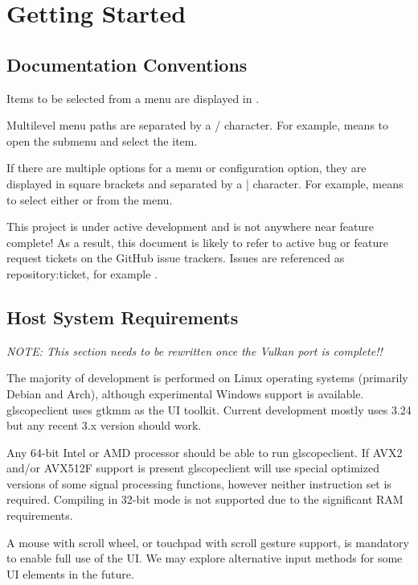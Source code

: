 \chapter{Getting Started}

\section{Documentation Conventions}

Items to be selected from a menu are displayed in .

Multilevel menu paths are separated by a / character. For example,  means to open the
 submenu and select the  item.

If there are multiple options for a menu or configuration option, they are displayed in square brackets and separated
by a | character. For example,  means to select either
 or  from the 
menu.

This project is under active development and is not anywhere near feature complete! As a result, this document is
likely to refer to active bug or feature request tickets on the GitHub issue trackers. Issues are referenced as
repository:ticket, for example .

\section{Host System Requirements}

\emph{NOTE: This section needs to be rewritten once the Vulkan port is complete!!}

The majority of development is performed on Linux operating systems (primarily Debian and Arch), although experimental
Windows support is available. glscopeclient uses gtkmm as the UI toolkit. Current development mostly uses 3.24 but any
recent 3.x version should work.

Any 64-bit Intel or AMD processor should be able to run glscopeclient. If AVX2 and/or AVX512F support is present
glscopeclient will use special optimized versions of some signal processing functions, however neither instruction set
is required. Compiling in 32-bit mode is not supported due to the significant RAM requirements.

A mouse with scroll wheel, or touchpad with scroll gesture support, is mandatory to enable full use of the UI. We may
explore alternative input methods for some UI elements in the future.

